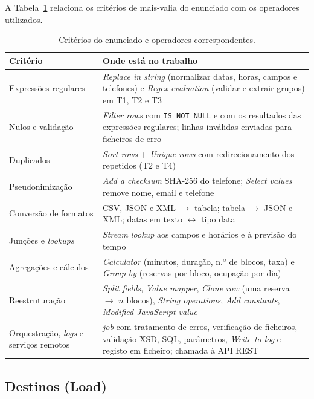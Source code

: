 \documentclass[11pt,a4paper]{article}
\begin{document}
A Tabela~\ref{tab:operadores} relaciona os critérios de mais-valia do enunciado com os operadores utilizados.

\begin{table}[htbp]
\centering
\caption{Critérios do enunciado e operadores correspondentes.}
\label{tab:operadores}
\small
\renewcommand{\arraystretch}{1.25}
\begin{tabular}{@{}p{4.2cm}p{10.6cm}@{}}
\toprule
\textbf{Critério} & \textbf{Onde está no trabalho} \\
\midrule
Expressões regulares & \textit{Replace in string} (normalizar datas, horas, campos e telefones) e \textit{Regex evaluation} (validar e extrair grupos) em T1, T2 e T3 \\
Nulos e validação & \textit{Filter rows} com \texttt{IS NOT NULL} e com os resultados das expressões regulares; linhas inválidas enviadas para ficheiros de erro \\
Duplicados & \textit{Sort rows} + \textit{Unique rows} com redirecionamento dos repetidos (T2 e T4) \\
Pseudonimização & \textit{Add a checksum} SHA-256 do telefone; \textit{Select values} remove nome, email e telefone \\
Conversão de formatos & CSV, JSON e XML $\rightarrow$ tabela; tabela $\rightarrow$ JSON e XML; datas em texto $\leftrightarrow$ tipo data \\
Junções e \textit{lookups} & \textit{Stream lookup} aos campos e horários e à previsão do tempo \\
Agregações e cálculos & \textit{Calculator} (minutos, duração, n.º de blocos, taxa) e \textit{Group by} (reservas por bloco, ocupação por dia) \\
Reestruturação & \textit{Split fields}, \textit{Value mapper}, \textit{Clone row} (uma reserva $\rightarrow$ $n$ blocos), \textit{String operations}, \textit{Add constants}, \textit{Modified JavaScript value} \\
Orquestração, \textit{logs} e serviços remotos & \textit{job} com tratamento de erros, verificação de ficheiros, validação XSD, SQL, parâmetros, \textit{Write to log} e registo em ficheiro; chamada à API REST \\
\bottomrule
\end{tabular}
\end{table}

\subsection{Destinos (Load)}
\end{document}
